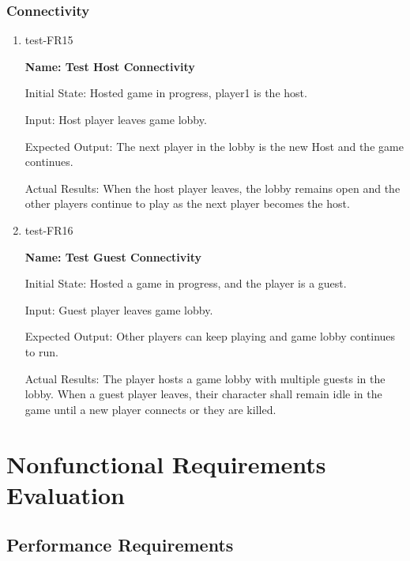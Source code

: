 \documentclass[12pt, titlepage]{article}
\begin{document}
\subsubsection{Connectivity}
\begin{enumerate}

\item{test-FR15\\}

\textbf{Name: Test Host Connectivity}

Initial State: Hosted game in progress, player1 is the host. 
					
Input: Host player leaves game lobby.
					
Expected Output: The next player in the lobby is the new Host and the game continues. 

Actual Results: When the host player leaves, the lobby remains open and the other players continue to play as the next player becomes the host.  

\item{test-FR16\\}

\textbf{Name: Test Guest Connectivity}

Initial State: Hosted a game in progress, and the player is a guest.
					
Input: Guest player leaves game lobby.
					
Expected Output: Other players can keep playing and game lobby continues to run.

Actual Results: The player hosts a game lobby with multiple guests in the lobby. When a guest player leaves, their character shall remain idle in the game until a new player connects or they are killed.  

\end{enumerate}
\section{Nonfunctional Requirements Evaluation}

\subsection{Performance Requirements}
		
\end{document}
